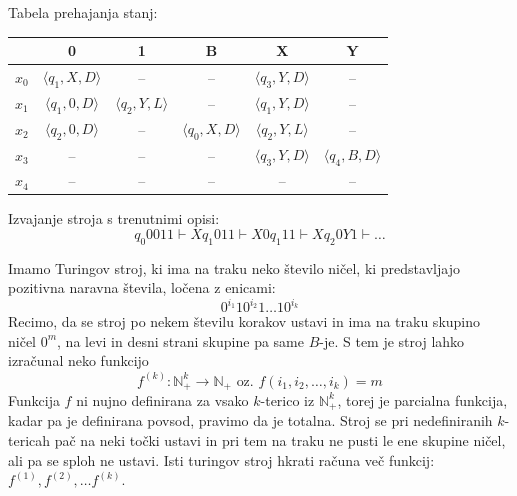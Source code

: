 \documentclass[10pt,a4paper,oneside]{book}
\begin{document}
{    Tabela prehajanja stanj:\\
	\begin{center}
    \begin{tabular}{ c | c c c c c}
	& 0 & 1 & B & X & Y\\ \hline
	$x_0$& $\langle q_1,X,D\rangle$ & -- & -- & $\langle q_3,Y,D\rangle$ & --\\
	$x_1$& $\langle q_1,0,D\rangle$ & $\langle q_2,Y,L\rangle$ & -- & $\langle q_1,Y,D\rangle$ & --\\
	$x_2$& $\langle q_2,0,D\rangle$ & -- & $\langle q_0,X,D\rangle$ & $\langle q_2,Y,L\rangle$ & --\\
	$x_3$& -- & -- & -- & $\langle q_3,Y,D\rangle$ & $\langle q_4,B,D\rangle$\\
	$x_4$& -- & -- & -- & -- & --\\
	\end{tabular}
	\end{center}
	\br
	Izvajanje stroja s trenutnimi opisi:
	\[ q_0 0011 \vdash X q_1 011 \vdash X 0 q_1 11 \vdash X q_2 0 Y 1 \vdash \dots \]
}
Imamo Turingov stroj, ki ima na traku neko število ničel, ki predstavljajo pozitivna naravna števila, ločena z enicami:
	\[ 0^{i_1} 1 0^{i_2} 1  \dots 1 0^{i_k} \]
Recimo, da se stroj po nekem številu korakov ustavi in ima na traku skupino ničel $0^m$, na levi in desni strani skupine pa same $B$-je. S tem je stroj lahko izračunal neko funkcijo
	\[ f^{(k)}:\mathbb{N}_+^k \rightarrow \mathbb{N}_+ \mbox{\ \ oz. \ \ } f(i_1, i_2, \dots, i_k) = m \]
Funkcija $f$ ni nujno definirana za vsako $k$-terico iz $\mathbb{N}_+^k$, torej je parcialna funkcija, kadar pa je definirana povsod, pravimo da je totalna. Stroj se pri nedefiniranih $k$-tericah pač na neki točki ustavi in pri tem na traku ne pusti le ene skupine ničel, ali pa se sploh ne ustavi.
Isti turingov stroj hkrati računa več funkcij: $f^{(1)}, f^{(2)}, \dots f^{(k)}$.%
\end{document}
